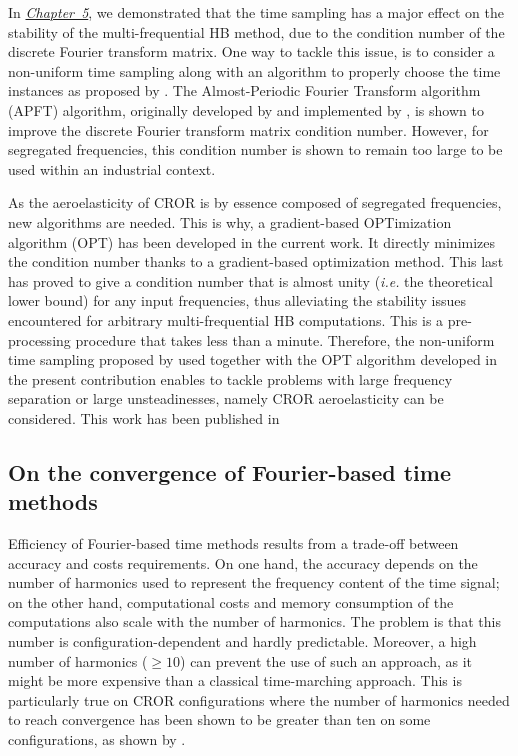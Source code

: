 In \hyperref[cha:limitations_condition_number]{\emph{Chapter~5}},
we demonstrated that the time sampling has a major effect on the
stability of the multi-frequential HB 
method, due to the condition number of the discrete Fourier
transform matrix. One way to tackle this issue, 
is to consider a non-uniform time sampling
along with an algorithm to properly choose the time instances
as proposed by \citet{ThesisGuedeney}.
The Almost-Periodic Fourier Transform algorithm (APFT) 
algorithm, originally developed by \citet{Kundert1988} and implemented by 
\citet{ThesisGuedeney}, is shown to improve the discrete
Fourier transform matrix condition number.
However, for segregated frequencies, this condition number
is shown to remain too large to be used within an industrial context.

As the aeroelasticity of CROR is by essence
composed of segregated frequencies, new algorithms are needed.
This is why, a gradient-based OPTimization algorithm (OPT) 
has been developed in the current work.
It directly minimizes the condition number thanks to a
gradient-based optimization method. This last has proved to
give a condition number that is almost unity (\emph{i.e.} the
theoretical lower bound) for any input frequencies,
thus alleviating the stability issues encountered for arbitrary
multi-frequential HB computations.
This is a pre-processing procedure
that takes less than a minute.
Therefore, the non-uniform time sampling proposed by \citet{ThesisGuedeney}
used together with the OPT algorithm 
developed in the present contribution
enables to tackle problems with large frequency 
separation or large unsteadinesses, namely CROR aeroelasticity
can be considered.
This work has been published in
\begin{quote}
\end{quote}


\subsection*{On the convergence of Fourier-based time methods}

Efficiency of Fourier-based time methods results 
from a trade-off between accuracy and 
costs requirements.
On one hand, the accuracy depends on the number of harmonics
used to represent the frequency content of the time 
signal; on the other hand, computational costs and 
memory consumption of the computations also scale
with the number of harmonics. 
The problem is that this number is 
configuration-dependent and hardly predictable. 
Moreover, a high number of harmonics
($\geq 10$) can prevent the use of such an approach,
as it might be more expensive than a classical time-marching approach.
This is particularly true on CROR configurations where the number
of harmonics needed to reach convergence
has been shown to be greater than ten
on some configurations, as shown by \citet{ThesisFrancois}.

